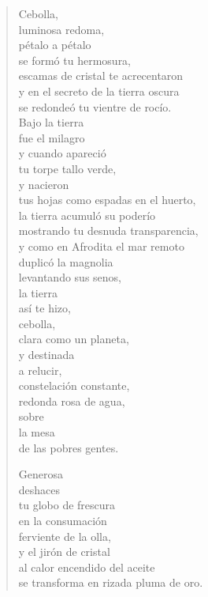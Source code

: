 \documentclass[12pt]{article}
\begin{document}
\clearpage
{}
\begin{verse}

Cebolla,\\
luminosa redoma,\\
pétalo a pétalo\\
se formó tu hermosura,\\
escamas de cristal te acrecentaron\\
y en el secreto de la tierra oscura\\
se redondeó tu vientre de rocío.\\
Bajo la tierra\\
fue el milagro\\
y cuando apareció\\
tu torpe tallo verde,\\
y nacieron\\
tus hojas como espadas en el huerto,\\
la tierra acumuló su poderío\\
mostrando tu desnuda transparencia,\\
y como en Afrodita el mar remoto\\
duplicó la magnolia\\
levantando sus senos,\\
la tierra\\
así te hizo,\\
cebolla,\\
clara como un planeta,\\
y destinada\\
a relucir,\\
constelación constante,\\
redonda rosa de agua,\\
sobre\\
la mesa\\
de las pobres gentes.  

Generosa\\
deshaces\\
tu globo de frescura\\
en la consumación\\
ferviente de la olla,\\
y el jirón de cristal\\
al calor encendido del aceite\\
se transforma en rizada pluma de oro.  


\end{verse}
\end{document}
